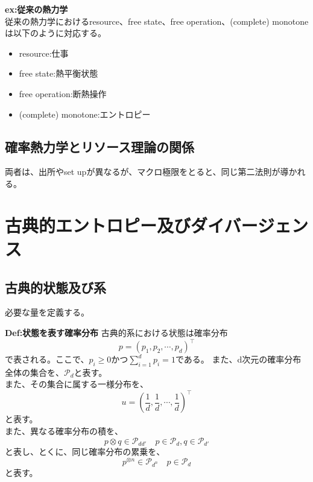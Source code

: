 \documentclass[a4paper,11pt]{jsarticle}
\numberwithin{equation}{section}
\begin{document}
\textbf{ex:従来の熱力学}\\
従来の熱力学におけるresource、free state、free operation、(complete) monotoneは以下のように対応する。\\
\begin{itemize}
    \item resource:仕事
    \item free state:熱平衡状態
    \item free operation:断熱操作
    \item (complete) monotone:エントロピー
\end{itemize}

\subsection{確率熱力学とリソース理論の関係}
両者は、出所やset upが異なるが、マクロ極限をとると、同じ第二法則が導かれる。\\

\newpage
\section{古典的エントロピー及びダイバージェンス}
\subsection{古典的状態及び系}
必要な量を定義する。\\
\begin{itembox}[l]{\textbf{Def:状態を表す確率分布}}
    古典的系における状態は確率分布
    \begin{equation}
        p = (p_1, p_2, \cdots, p_d)^{\top}
    \end{equation}
    で表される。ここで、$p_i \geq 0$かつ$\sum_{i=1}^{d}p_i = 1$である。
    また、d次元の確率分布全体の集合を、$\mathcal{P}_d$と表す。\\
    また、その集合に属する一様分布を、
    \begin{equation}
        u = \left(\frac{1}{d}, \frac{1}{d}, \cdots, \frac{1}{d}\right)^{\top}
    \end{equation}
    と表す。\\
    また、異なる確率分布の積を、
    \begin{equation}
        p \otimes q \in \mathcal{P}_{dd'} \quad p \in \mathcal{P}_d, q \in \mathcal{P}_{d'}
    \end{equation}
    と表し、とくに、同じ確率分布の累乗を、
    \begin{equation}
        p^{\otimes n} \in \mathcal{P}_{d^n} \quad p \in \mathcal{P}_d
    \end{equation}
    と表す。
\end{itembox}
\end{document}
